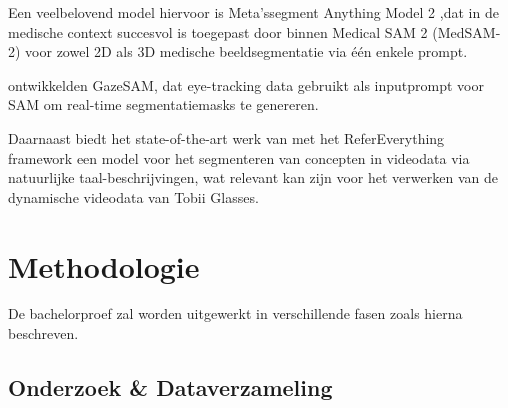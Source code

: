 Een veelbelovend model hiervoor is Meta’s\newline segment Anything Model 2 \autocite{Ravi2024},\newline dat in de medische context succesvol is toegepast door \textcite{Zhu2024}
binnen Medical SAM 2 (MedSAM-2) voor zowel 2D als 3D medische beeldsegmentatie via één enkele prompt. 

\textcite{Wang2023} ontwikkelden GazeSAM, dat eye-tracking 
data gebruikt als inputprompt voor SAM om real-time segmentatiemasks te genereren.

Daarnaast biedt het state-of-the-art werk van \textcite{Bagchi2024} met het ReferEverything framework een model voor het segmenteren van concepten in 
videodata via natuurlijke taal-\newline beschrijvingen, wat relevant kan zijn voor het verwerken van de dynamische videodata van Tobii Glasses.


\section{Methodologie}%
\label{sec:methodologie}
De bachelorproef zal worden uitgewerkt in verschillende fasen zoals hierna beschreven.

\subsection{Onderzoek \& Dataverzameling}

